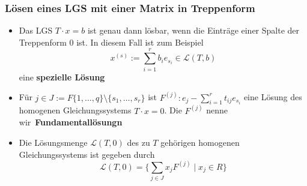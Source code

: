 \documentclass{kit}
\begin{document}
    \subsubsection{Lösen eines LGS mit einer Matrix in Treppenform}
      \begin{itemize}
        \item Das LGS $T\cdot x=b$ ist genau dann lösbar, wenn die Einträge einer Spalte der Treppenform 0 ist. In diesem Fall ist zum Beispiel
          $$x^{(s)}:=\sum_{i=1}^rb_ie_{s_i}\in\mathcal{L}(T,b)$$
          eine \textbf{spezielle Lösung}
        \item Für $j\in J:=F\{1,\dots,q\}\setminus\{s_1,\dots,s_r\}$ ist $F^{(j)}:e_j-\sum_{i=1}^rt_{ij}e_{s_i}$ eine Lösung des homogenen Gleichungssystems $T\cdot x=0$. Die $F^{(j)}$ nenne wir \textbf{Fundamentallösungn}
        \item Die Lösungsmenge $\mathcal{L}(T,0)$ des zu $T$ gehörigen homogenen Gleichungssystems ist gegeben durch
          $$\mathcal{L}(T,0)=\{\sum_{j\in J}x_jF^{(j)}\mid x_j\in R\}$$
      \end{itemize}
\end{document}
